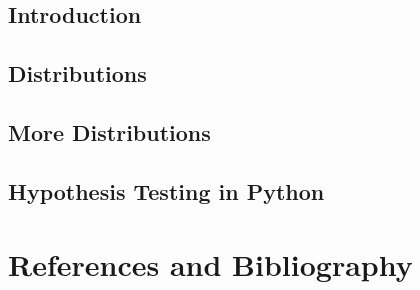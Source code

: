 \documentclass[11pt]{article}
\begin{document}
    \subsection{Introduction}
    \subsection{Distributions}
    \subsection{More Distributions}
    \subsection{Hypothesis Testing in Python}



















\section{References and Bibliography}






\end{document}
